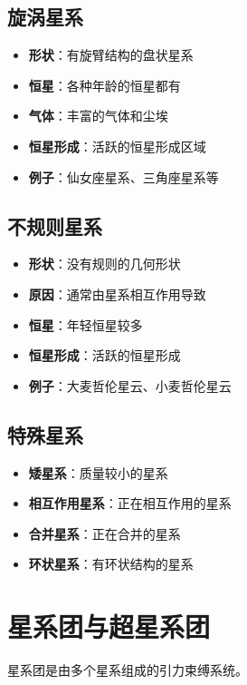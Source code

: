 \documentclass[12pt,UTF8]{ctexbook}
\begin{document}
\subsection{旋涡星系}

\begin{itemize}
  \item \textbf{形状}：有旋臂结构的盘状星系
  \item \textbf{恒星}：各种年龄的恒星都有
  \item \textbf{气体}：丰富的气体和尘埃
  \item \textbf{恒星形成}：活跃的恒星形成区域
  \item \textbf{例子}：仙女座星系、三角座星系等
\end{itemize}

\subsection{不规则星系}

\begin{itemize}
  \item \textbf{形状}：没有规则的几何形状
  \item \textbf{原因}：通常由星系相互作用导致
  \item \textbf{恒星}：年轻恒星较多
  \item \textbf{恒星形成}：活跃的恒星形成
  \item \textbf{例子}：大麦哲伦星云、小麦哲伦星云
\end{itemize}

\subsection{特殊星系}

\begin{itemize}
  \item \textbf{矮星系}：质量较小的星系
  \item \textbf{相互作用星系}：正在相互作用的星系
  \item \textbf{合并星系}：正在合并的星系
  \item \textbf{环状星系}：有环状结构的星系
\end{itemize}

\section{星系团与超星系团}

星系团是由多个星系组成的引力束缚系统。
\end{document}
